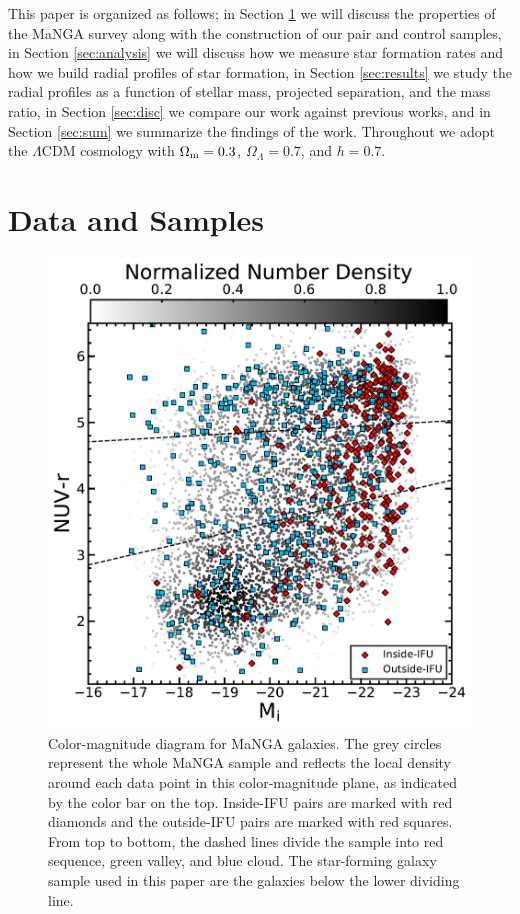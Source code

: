 \documentclass[iop,revtex4,twocolumn,apj,numberedappendix,appendixfloats]{emulateapj}
\begin{document}
This paper is organized as follows; in Section \ref{sec:data} we will discuss the properties of the MaNGA survey along with the construction of our pair and control samples, in Section \ref{sec:analysis} we will discuss how we measure star formation rates and how we build radial profiles of star formation, in Section \ref{sec:results} we study the radial profiles as a function of stellar mass, projected separation, and the mass ratio, in Section \ref{sec:disc} we compare our work against previous works, and in Section \ref{sec:sum} we summarize the findings of the work. 
Throughout we adopt the $\Lambda$CDM cosmology with $\Omega_{\rm m}=0.3$, $\Omega_\Lambda=0.7$, and $h=0.7$. 

\section{Data and Samples}\label{sec:data}

\begin{figure}
\centering
\includegraphics[width=\linewidth]{fig/color-mag.pdf}
\caption[]{Color-magnitude diagram for MaNGA galaxies. The grey circles represent the whole MaNGA sample and reflects the local density around each data point in this color-magnitude plane, as indicated by the color bar on the top. Inside-IFU pairs are marked with red diamonds and the outside-IFU pairs are marked with red squares. From top to bottom, the dashed lines divide the sample into red sequence, green valley, and blue cloud. The star-forming galaxy sample used in this paper are the galaxies below the lower dividing line.}
\label{fig:cmd}
\end{figure}
\end{document}
